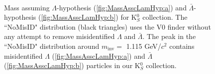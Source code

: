 \documentclass[../AnalysisNoteJBuxton.tex]{subfiles}
\begin{document}
\begin{figure}[h!]
  \centering
  \\
  \caption[$\Lambda$($\bar{\Lambda}$) contamination in K$^{0}_{S}$ collection]{Mass assuming $\Lambda$-hypothesis (\ref{fig:MassAsscLamHyp:a}) and $\bar{\Lambda}$-hypothesis (\ref{fig:MassAsscLamHyp:b}) for K$^{0}_{S}$ collection.
  The ``NoMisID" distribution (black triangles) uses the V0 finder without any attempt to remove misidentified $\Lambda$ and $\bar{\Lambda}$.
  The peak in the ``NoMisID" distribution around $m_{\mathrm{inv}} = $ 1.115 GeV/$c^{2}$ contains misidentified $\Lambda$ (\ref{fig:MassAsscLamHyp:a}) and $\bar{\Lambda}$ (\ref{fig:MassAsscLamHyp:b}) particles in our K$^{0}_{S}$ collection.  
}
\end{figure}
\end{document}

